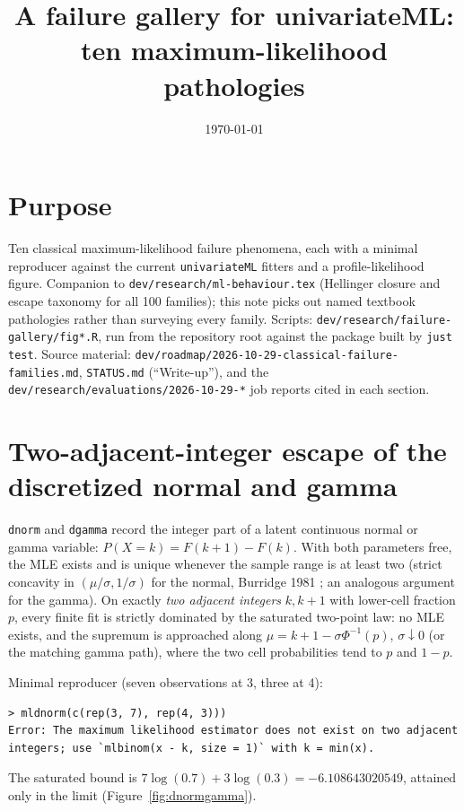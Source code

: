 \documentclass[11pt]{article}
\title{A failure gallery for univariateML: ten maximum-likelihood pathologies}
\author{}
\date{\today}
\newcommand{\code}[1]{\texttt{#1}}
\theoremstyle{plain}
\theoremstyle{definition}
\theoremstyle{remark}
\begin{document}
\maketitle

\section*{Purpose}

Ten classical maximum-likelihood failure phenomena, each with a minimal
reproducer against the current \code{univariateML} fitters and a
profile-likelihood figure. Companion to \code{dev/research/ml-behaviour.tex}
(Hellinger closure and escape taxonomy for all 100 families); this note
picks out named textbook pathologies rather than surveying every family.
Scripts: \code{dev/research/failure-gallery/fig*.R}, run from the repository root
against the package built by \code{just test}. Source material:
\code{dev/roadmap/2026-10-29-classical-failure-families.md},
\code{STATUS.md} (``Write-up''), and the \code{dev/research/evaluations/2026-10-29-*}
job reports cited in each section.

\section{Two-adjacent-integer escape of the discretized normal and gamma}
\label{sec:dnormgamma}

\code{dnorm} and \code{dgamma} record the integer part of a latent
continuous normal or gamma variable: $P(X=k)=F(k+1)-F(k)$. With both
parameters free, the MLE exists and is unique whenever the sample range is
at least two (strict concavity in $(\mu/\sigma,1/\sigma)$ for the normal,
Burridge 1981 \cite{burridge1981}; an analogous argument for the gamma). On
exactly \emph{two adjacent integers} $k,k+1$ with lower-cell fraction $p$,
every finite fit is strictly dominated by the saturated two-point law: no
MLE exists, and the supremum is approached along $\mu=k+1-\sigma\Phi^{-1}(p)$,
$\sigma\downarrow0$ (or the matching gamma path), where the two cell
probabilities tend to $p$ and $1-p$.

Minimal reproducer (seven observations at 3, three at 4):
\begin{verbatim}
> mldnorm(c(rep(3, 7), rep(4, 3)))
Error: The maximum likelihood estimator does not exist on two adjacent
integers; use `mlbinom(x - k, size = 1)` with k = min(x).
\end{verbatim}
The saturated bound is $7\log(0.7)+3\log(0.3)=-6.108643020549$, attained
only in the limit (Figure~\ref{fig:dnormgamma}).
\end{document}
